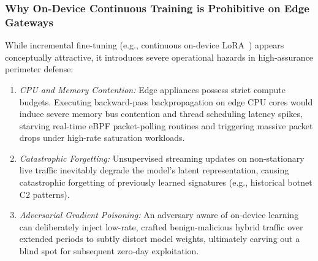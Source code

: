 \documentclass{ieeeaccess}
\renewcommand{\_}{\textunderscore\allowbreak}
\begin{document}
\subsubsection{Why On-Device Continuous Training is Prohibitive on Edge Gateways}
While incremental fine-tuning (e.g., continuous on-device LoRA~\cite{dettmers2023qlora}) appears conceptually attractive, it introduces severe operational hazards in high-assurance perimeter defense:
\begin{enumerate}
  \item \textit{CPU and Memory Contention:} Edge appliances possess strict compute budgets. Executing backward-pass backpropagation on edge CPU cores would induce severe memory bus contention and thread scheduling latency spikes, starving real-time eBPF packet-polling routines and triggering massive packet drops under high-rate saturation workloads.
  \item \textit{Catastrophic Forgetting:} Unsupervised streaming updates on non-stationary live traffic inevitably degrade the model's latent representation, causing catastrophic forgetting of previously learned signatures (e.g., historical botnet C2 patterns).
  \item \textit{Adversarial Gradient Poisoning:} An adversary aware of on-device learning can deliberately inject low-rate, crafted benign-malicious hybrid traffic over extended periods to subtly distort model weights, ultimately carving out a blind spot for subsequent zero-day exploitation.
\end{enumerate}
\end{document}
